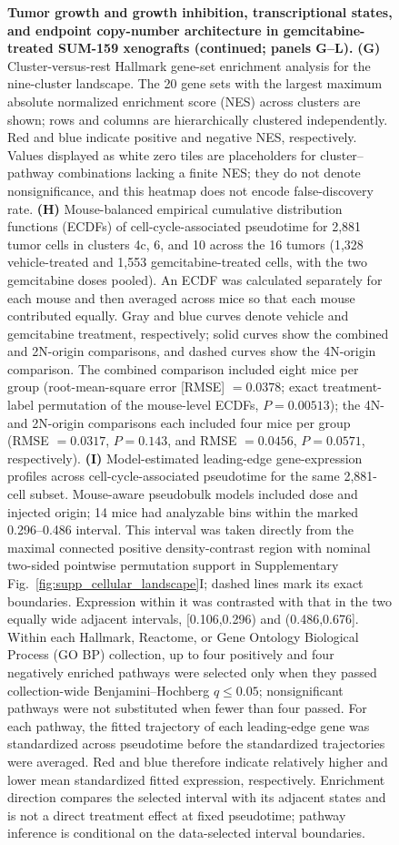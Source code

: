 \documentclass[11pt,notitlepage]{article}
\begin{document}
\begin{figure}[p]
{\textbf{Tumor growth and growth inhibition, transcriptional states, and endpoint copy-number architecture in gemcitabine-treated SUM-159 xenografts (continued; panels G--L).}
\textbf{(G)} Cluster-versus-rest Hallmark gene-set enrichment analysis for the nine-cluster landscape. The 20 gene sets with the largest maximum absolute normalized enrichment score (NES) across clusters are shown; rows and columns are hierarchically clustered independently. Red and blue indicate positive and negative NES, respectively. Values displayed as white zero tiles are placeholders for cluster--pathway combinations lacking a finite NES; they do not denote nonsignificance, and this heatmap does not encode false-discovery rate.
\textbf{(H)} Mouse-balanced empirical cumulative distribution functions (ECDFs) of cell-cycle-associated pseudotime for 2,881 tumor cells in clusters 4c, 6, and 10 across the 16 tumors (1,328 vehicle-treated and 1,553 gemcitabine-treated cells, with the two gemcitabine doses pooled). An ECDF was calculated separately for each mouse and then averaged across mice so that each mouse contributed equally. Gray and blue curves denote vehicle and gemcitabine treatment, respectively; solid curves show the combined and 2N-origin comparisons, and dashed curves show the 4N-origin comparison. The combined comparison included eight mice per group (root-mean-square error [RMSE] \(=0.0378\); exact treatment-label permutation of the mouse-level ECDFs, \(P=0.00513\)); the 4N- and 2N-origin comparisons each included four mice per group (RMSE \(=0.0317\), \(P=0.143\), and RMSE \(=0.0456\), \(P=0.0571\), respectively).
\textbf{(I)} Model-estimated leading-edge gene-expression profiles across cell-cycle-associated pseudotime for the same 2,881-cell subset. Mouse-aware pseudobulk models included dose and injected origin; 14 mice had analyzable bins within the marked 0.296--0.486 interval. This interval was taken directly from the maximal connected positive density-contrast region with nominal two-sided pointwise permutation support in Supplementary Fig.~\ref{fig:supp_cellular_landscape}I; dashed lines mark its exact boundaries. Expression within it was contrasted with that in the two equally wide adjacent intervals, [0.106,0.296) and (0.486,0.676]. Within each Hallmark, Reactome, or Gene Ontology Biological Process (GO BP) collection, up to four positively and four negatively enriched pathways were selected only when they passed collection-wide Benjamini--Hochberg \(q\leq0.05\); nonsignificant pathways were not substituted when fewer than four passed. For each pathway, the fitted trajectory of each leading-edge gene was standardized across pseudotime before the standardized trajectories were averaged. Red and blue therefore indicate relatively higher and lower mean standardized fitted expression, respectively. Enrichment direction compares the selected interval with its adjacent states and is not a direct treatment effect at fixed pseudotime; pathway inference is conditional on the data-selected interval boundaries.
}
\end{figure}
\end{document}
